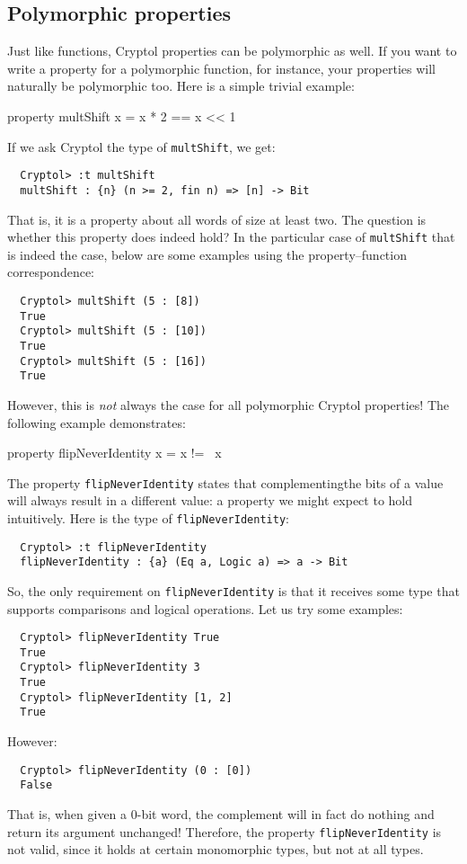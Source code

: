 \subsection{Polymorphic properties}
\label{sec:polythm}

Just like functions, Cryptol properties can be polymorphic as well. If
you want to write a property for a polymorphic function, for instance,
your properties will naturally be polymorphic too. Here is a simple
trivial example:
\begin{code}
  property multShift x = x * 2 == x << 1
\end{code}
If we ask Cryptol the type of {\tt multShift}, we get:
\begin{Verbatim}
  Cryptol> :t multShift
  multShift : {n} (n >= 2, fin n) => [n] -> Bit
\end{Verbatim}
That is, it is a property about all words of size at least two. The
question is whether this property does indeed hold? In the particular
case of {\tt multShift} that is indeed the case, below are some
examples using the property--function correspondence:\indThmFuncCorr
\begin{Verbatim}
  Cryptol> multShift (5 : [8])
  True
  Cryptol> multShift (5 : [10])
  True
  Cryptol> multShift (5 : [16])
  True
\end{Verbatim}
However, this is \emph{not} always the case for all polymorphic Cryptol
properties! The following example demonstrates:
\begin{code}
  property flipNeverIdentity x = x != ~x
\end{code}
The property {\tt flipNeverIdentity} states that
complementing\indComplement the bits of a value will always result in
a different value: a property we might expect to hold
intuitively. Here is the type of {\tt flipNeverIdentity}:
\begin{Verbatim}
  Cryptol> :t flipNeverIdentity
  flipNeverIdentity : {a} (Eq a, Logic a) => a -> Bit
\end{Verbatim}
So, the only requirement on \texttt{flipNeverIdentity} is that it
receives some type that supports comparisons and logical operations.
Let us try some examples:
\begin{Verbatim}
  Cryptol> flipNeverIdentity True
  True
  Cryptol> flipNeverIdentity 3
  True
  Cryptol> flipNeverIdentity [1, 2]
  True
\end{Verbatim}
However:
\begin{Verbatim}
  Cryptol> flipNeverIdentity (0 : [0])
  False
\end{Verbatim}
That is, when given a 0-bit word, the complement will in
fact do nothing and return its argument unchanged! Therefore, the
property {\tt flipNeverIdentity} is not valid, since it holds at
certain monomorphic types, but not at all types.\indMonomorphism

